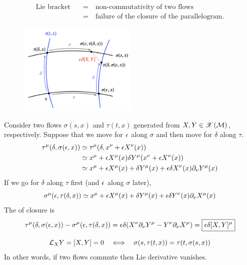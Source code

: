 \documentclass[a4paper, 10pt]{article}
\begin{document}
\begin{obs}
    \begin{align*}
        \text{Lie bracket} \quad &= \quad \text{non-commutativity of two flows} \\
        &= \quad \text{failure of the closure of the parallelogram.}
    \end{align*}

    \begin{figure}[htbp]
        \centering
        \includegraphics[width = 0.5\textwidth]{../images/lecture08/8_01.png}
    \end{figure}
    
    Consider two flows $\sigma(s, x)$ and $\tau(t, x)$ generated from $X, Y \in \mathscr{X}(\mathcal{M})$, respectively. Suppose that we move for $\epsilon$ along $\sigma$ and then move for $\delta$ along $\tau$.
    \begin{align*}
        \tau^{\mu}(\delta, \sigma(\epsilon, x)) &\simeq \tau^{\mu}(\delta, x^{\nu} + \epsilon X^{\nu}(x)) \\
        &\simeq x^{\mu} + \epsilon X^{\mu}(x) \delta Y^{\mu}(x^{\nu} + \epsilon X^{\nu}(x)) \\
        &\simeq x^{\mu} + \epsilon X^{\mu}(x) + \delta Y^{\mu}(x) + \epsilon\delta X^{\nu}(x)\partial_{\nu}Y^{\mu}(x)
    \end{align*}
    If we go for $\delta$ along $\tau$ first (and $\epsilon$ along $\sigma$ later),
    \[ \sigma^{\mu}(\epsilon, \tau(\delta, x)) \simeq x^{\mu} + \epsilon X^{\mu}(x) + \delta Y^{\mu}(x) + \epsilon\delta Y^{\nu}(x)\partial_{\nu}X^{\mu}(x) \]
    The  of closure is
    \[ \tau^{\mu}(\delta, \sigma(\epsilon, x)) - \sigma^{\mu}(\epsilon, \tau(\delta, x)) = \epsilon\delta(X^{\nu}\partial_{\nu}Y^{\mu} - Y^{\nu}\partial_{\nu}X^{\mu}) = \boxed{\epsilon\delta[X,Y]^{\mu}} \]
\end{obs}

\begin{remark}
    \[ \mathcal{L}_{X}Y = [X, Y] = 0 \quad\Longleftrightarrow\quad \sigma(s, \tau(t, x)) = \tau(t, \sigma(s, x)) \]
    In other words, if two flows commute then Lie derivative vanishes.
\end{remark}
\newpage
\end{document}
